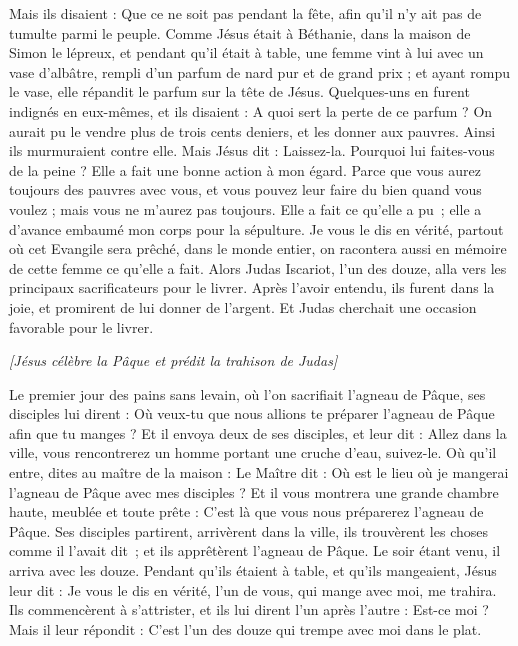 \begin{multicols}{2}
Mais ils disaient : Que ce ne soit pas pendant la fête, afin qu'il n’y ait pas de tumulte parmi le peuple.
Comme Jésus était à Béthanie, dans la maison de Simon le lépreux, et pendant qu’il était à table, une femme vint à lui avec un vase d'albâtre, rempli d'un parfum de nard pur et de grand prix ; et ayant rompu le vase, elle répandit le parfum sur la tête de Jésus.
Quelques-uns en furent indignés en eux-mêmes, et ils disaient : A quoi sert la perte de ce parfum ?
On aurait pu le vendre plus de trois cents deniers, et les donner aux pauvres. Ainsi ils murmuraient contre elle.
Mais Jésus dit : Laissez-la. Pourquoi lui faites-vous de la peine ? Elle a fait une bonne action à mon égard.
Parce que vous aurez toujours des pauvres avec vous, et vous pouvez leur faire du bien quand vous voulez ; mais vous ne m'aurez pas toujours.
Elle a fait ce qu’elle a pu ; elle a d’avance embaumé mon corps pour la sépulture.
Je vous le dis en vérité, partout où cet Evangile sera prêché, dans le monde entier, on racontera aussi en mémoire de cette femme ce qu’elle a fait.
Alors Judas Iscariot, l'un des douze, alla vers les principaux sacrificateurs pour le livrer.
Après l’avoir entendu, ils furent dans la joie, et promirent de lui donner de l'argent. Et Judas cherchait une occasion favorable pour le livrer.
\begin{center}
\textit{[Jésus célèbre la Pâque et prédit la trahison de Judas]}
\end{center}
\PPE{}
Le premier jour des pains sans levain, où l’on sacrifiait l'agneau de Pâque, ses disciples lui dirent : Où veux-tu que nous allions te préparer l'agneau de Pâque afin que tu manges ?
Et il envoya deux de ses disciples, et leur dit : Allez dans la ville, vous rencontrerez un homme portant une cruche d'eau, suivez-le.
Où qu’il entre, dites au maître de la maison : Le Maître dit : Où est le lieu où je mangerai l'agneau de Pâque avec mes disciples ?
Et il vous montrera une grande chambre haute, meublée et toute prête : C’est là que vous nous préparerez l'agneau de Pâque.
Ses disciples partirent, arrivèrent dans la ville, ils trouvèrent les choses comme il l’avait dit ; et ils apprêtèrent l'agneau de Pâque.
Le soir étant venu, il arriva avec les douze.
Pendant qu’ils étaient à table, et qu'ils mangeaient, Jésus leur dit : Je vous le dis en vérité, l'un de vous, qui mange avec moi, me trahira.
Ils commencèrent à s'attrister, et ils lui dirent l'un après l'autre : Est-ce moi ?
Mais il leur répondit : C'est l'un des douze qui trempe avec moi dans le plat.

\end{multicols}
